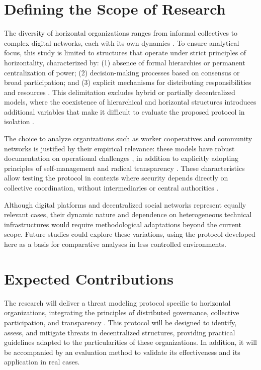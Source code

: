 \section{Defining the Scope of Research}
\label{sec:defining_research_scope}

The diversity of horizontal organizations ranges from informal collectives to
complex digital networks, each with its own dynamics \cite{EverydayRevolutions}.
To ensure analytical focus, this study is limited to structures that operate
under strict principles of horizontality, characterized by: (1) absence of
formal hierarchies or permanent centralization of power; (2) decision-making
processes based on consensus or broad participation; and (3) explicit mechanisms
for distributing responsibilities and resources \cite{Colbac}. This delimitation
excludes hybrid or partially decentralized models, where the coexistence of
hierarchical and horizontal structures introduces additional variables that make
it difficult to evaluate the proposed protocol in isolation
\cite{Non-HierarchicalForms}.

The choice to analyze organizations such as worker cooperatives and community
networks is justified by their empirical relevance: these models have robust
documentation on operational challenges \cite{WorkerCooperativesinAmerica}, in
addition to explicitly adopting principles of self-management and radical
transparency \cite{EverydayRevolutions}. These characteristics allow testing the
protocol in contexts where security depends directly on collective coordination,
without intermediaries or central authorities
\cite{ThreatModelingdesigningForSecurity}.

Although digital platforms and decentralized social networks
\cite{CreatingTheCollectiveSocialMedia} represent equally relevant cases, their
dynamic nature and dependence on heterogeneous technical infrastructures would
require methodological adaptations beyond the current scope. Future studies
could explore these variations, using the protocol developed here as a basis for
comparative analyses in less controlled environments.


\section{Expected Contributions}
\label{sec:expected_contributions}

The research will deliver a threat modeling protocol specific to horizontal
organizations, integrating the principles of distributed governance, collective
participation, and transparency \cite{Colbac}. This protocol will be designed to
identify, assess, and mitigate threats in decentralized structures, providing
practical guidelines adapted to the particularities of these organizations. In
addition, it will be accompanied by an evaluation method to validate its
effectiveness and its application in real cases.

